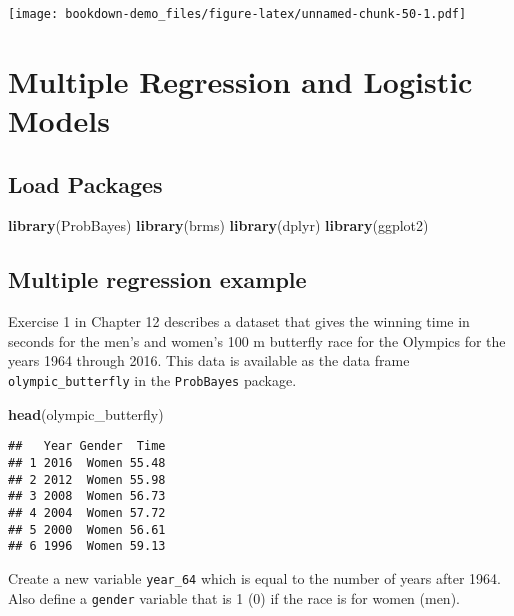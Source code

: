 \documentclass[
]{book}
\newenvironment{Shaded}{\begin{snugshade}}{\end{snugshade}}
\newcommand{\KeywordTok}[1]{\textcolor[rgb]{0.13,0.29,0.53}{\textbf{#1}}}
\newcommand{\NormalTok}[1]{#1}
\begin{document}
\texttt{[image: bookdown-demo\_files/figure-latex/unnamed-chunk-50-1.pdf]}

\hypertarget{multiple-regression-and-logistic-models}{%
\chapter{Multiple Regression and Logistic Models}\label{multiple-regression-and-logistic-models}}

\hypertarget{load-packages}{%
\section{Load Packages}\label{load-packages}}

\begin{Shaded}
\begin{Highlighting}[]
\KeywordTok{library}\NormalTok{(ProbBayes)}
\KeywordTok{library}\NormalTok{(brms)}
\KeywordTok{library}\NormalTok{(dplyr)}
\KeywordTok{library}\NormalTok{(ggplot2)}
\end{Highlighting}
\end{Shaded}

\hypertarget{multiple-regression-example}{%
\section{Multiple regression example}\label{multiple-regression-example}}

Exercise 1 in Chapter 12 describes a dataset that gives the winning time in seconds for the men's and women's 100 m butterfly race for the Olympics for the years 1964 through 2016. This data is available as the data frame \texttt{olympic\_butterfly} in the \texttt{ProbBayes} package.

\begin{Shaded}
\begin{Highlighting}[]
\KeywordTok{head}\NormalTok{(olympic_butterfly)}
\end{Highlighting}
\end{Shaded}

\begin{verbatim}
##   Year Gender  Time
## 1 2016  Women 55.48
## 2 2012  Women 55.98
## 3 2008  Women 56.73
## 4 2004  Women 57.72
## 5 2000  Women 56.61
## 6 1996  Women 59.13
\end{verbatim}

Create a new variable \texttt{year\_64} which is equal to the number of years after 1964. Also define a \texttt{gender} variable that is 1 (0) if the race is for women (men).
\end{document}
